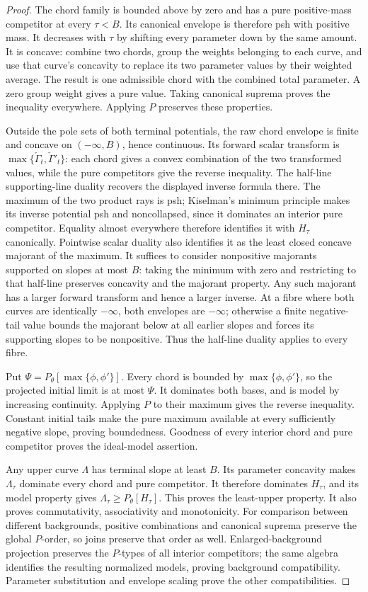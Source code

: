 \begin{proof}
The chord family is bounded above by zero and has a pure positive-mass competitor at every $\tau<B$. Its canonical envelope is therefore psh with positive mass. It decreases with $\tau$ by shifting every parameter down by the same amount. It is concave: combine two chords, group the weights belonging to each curve, and use that curve's concavity to replace its two parameter values by their weighted average. The result is one admissible chord with the combined total parameter. A zero group weight gives a pure value. Taking canonical suprema proves the inequality everywhere. Applying $P$ preserves these properties.

Outside the pole sets of both terminal potentials, the raw chord envelope is finite and concave on $(-\infty,B)$, hence continuous. Its forward scalar transform is $\max\{\check\Gamma_t,\check\Gamma'_t\}$: each chord gives a convex combination of the two transformed values, while the pure competitors give the reverse inequality. The half-line supporting-line duality recovers the displayed inverse formula there. The maximum of the two product rays is psh; Kiselman's minimum principle makes its inverse potential psh and noncollapsed, since it dominates an interior pure competitor. Equality almost everywhere therefore identifies it with $H_\tau$ canonically. Pointwise scalar duality also identifies it as the least closed concave majorant of the maximum. It suffices to consider nonpositive majorants supported on slopes at most $B$: taking the minimum with zero and restricting to that half-line preserves concavity and the majorant property. Any such majorant has a larger forward transform and hence a larger inverse. At a fibre where both curves are identically $-\infty$, both envelopes are $-\infty$; otherwise a finite negative-tail value bounds the majorant below at all earlier slopes and forces its supporting slopes to be nonpositive. Thus the half-line duality applies to every fibre.

Put $\Psi=P_\theta[\max\{\phi,\phi'\}]$. Every chord is bounded by $\max\{\phi,\phi'\}$, so the projected initial limit is at most $\Psi$. It dominates both bases, and is model by increasing continuity. Applying $P$ to their maximum gives the reverse inequality. Constant initial tails make the pure maximum available at every sufficiently negative slope, proving boundedness. Goodness of every interior chord and pure competitor proves the ideal-model assertion.

Any upper curve $\Lambda$ has terminal slope at least $B$. Its parameter concavity makes $\Lambda_\tau$ dominate every chord and pure competitor. It therefore dominates $H_\tau$, and its model property gives $\Lambda_\tau\geq P_\theta[H_\tau]$. This proves the least-upper property. It also proves commutativity, associativity and monotonicity. For comparison between different backgrounds, positive combinations and canonical suprema preserve the global $P$-order, so joins preserve that order as well. Enlarged-background projection preserves the $P$-types of all interior competitors; the same algebra identifies the resulting normalized models, proving background compatibility. Parameter substitution and envelope scaling prove the other compatibilities.


\end{proof}
